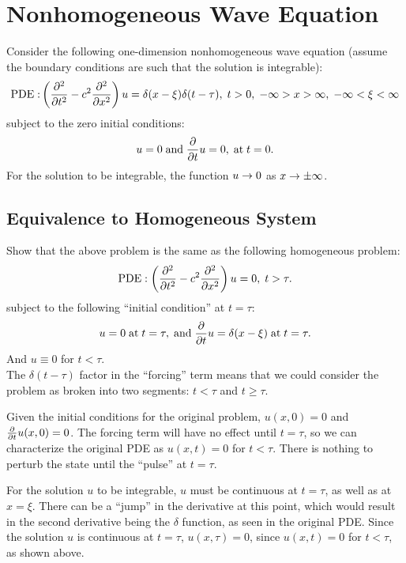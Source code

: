 \documentclass[12pt]{article}
\begin{document}
\section{Nonhomogeneous Wave Equation}
Consider the following one-dimension nonhomogeneous wave equation (assume the boundary conditions are such that the solution is integrable):
\begin{equation*}
\mathrm{PDE:} \left (\frac{\partial^2}{\partial t^2} - c^2\frac{\partial^2}{\partial x^2}\right ) u = \delta(x - \xi)\delta(t - \tau), \;t > 0, \; -\infty>x>\infty, \;-\infty<\xi<\infty
\end{equation*}
subject to the zero initial conditions:
\begin{equation*}
u = 0 \; \mathrm{and} \; \frac{\partial}{\partial t}u = 0, \; \mathrm{at} \; t = 0.
\end{equation*}
For the solution to be integrable, the function $u \rightarrow 0$ as $x \rightarrow \pm\infty$.

\subsection{Equivalence to Homogeneous System}
\label{part1}

Show that the above problem is the same as the following homogeneous problem:
\begin{equation*}
\mathrm{PDE}: \left (\frac{\partial^2}{\partial t^2} - c^2\frac{\partial^2}{\partial x^2}\right ) u = 0, \;t > \tau.
\end{equation*}
subject to the following ``initial condition'' at $t = \tau$:
\
\begin{equation*}
u = 0 \; \mathrm{at} \; t=\tau, \; \mathrm{and} \; \frac{\partial}{\partial t}u = \delta(x - \xi) \; \mathrm{at} \; t = \tau.
\end{equation*}
And $u \equiv 0$ for $t < \tau$.
\[ \]
The $\delta(t - \tau)$ factor in the ``forcing'' term means that we could consider the problem as broken into two segments: $t < \tau$ and $t \ge \tau$.

Given the initial conditions for the original problem, $u(x,0) = 0$ and $\frac{\partial}{\partial t}u(x,0) = 0$. The forcing term will have no effect until $t = \tau$, so we can characterize the original PDE as $u(x,t) = 0$ for $t < \tau$. There is nothing to perturb the state until the ``pulse'' at $t = \tau$.

For the solution $u$ to be integrable, $u$ must be continuous at $t = \tau$, as well as at $x = \xi$. There can be a ``jump'' in the derivative at this point, which would result in the second derivative being the $\delta$ function, as seen in the original PDE. Since the solution $u$ is continuous at $t = \tau$, $u(x,\tau) = 0$, since $u(x,t) = 0$ for $t < \tau$, as shown above.
\end{document}
